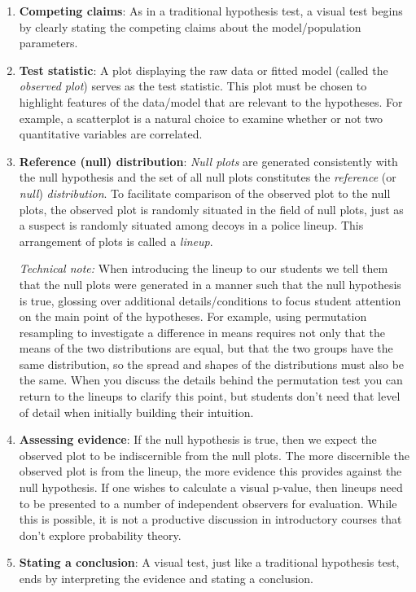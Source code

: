 \documentclass[12pt]{article}
\begin{document}
\begin{enumerate}
\def\labelenumi{\arabic{enumi}.}
\item
  \textbf{Competing claims}: As in a traditional hypothesis test, a
  visual test begins by clearly stating the competing claims about the
  model/population parameters.
\item
  \textbf{Test statistic}: A plot displaying the raw data or fitted
  model (called the \emph{observed plot}) serves as the test statistic.
  This plot must be chosen to highlight features of the data/model that
  are relevant to the hypotheses. For example, a scatterplot is a
  natural choice to examine whether or not two quantitative variables
  are correlated.
\item
  \textbf{Reference (null) distribution}: \emph{Null plots} are
  generated consistently with the null hypothesis and the set of all
  null plots constitutes the \emph{reference} (or \emph{null})
  \emph{distribution}. To facilitate comparison of the observed plot to
  the null plots, the observed plot is randomly situated in the field of
  null plots, just as a suspect is randomly situated among decoys in a
  police lineup. This arrangement of plots is called a \emph{lineup}.

  \emph{Technical note:} When introducing the lineup to our students we
  tell them that the null plots were generated in a manner such that the
  null hypothesis is true, glossing over additional details/conditions
  to focus student attention on the main point of the hypotheses. For
  example, using permutation resampling to investigate a difference in
  means requires not only that the means of the two distributions are
  equal, but that the two groups have the same distribution, so the
  spread and shapes of the distributions must also be the same. When you
  discuss the details behind the permutation test you can return to the
  lineups to clarify this point, but students don't need that level of
  detail when initially building their intuition.
\item
  \textbf{Assessing evidence}: If the null hypothesis is true, then we
  expect the observed plot to be indiscernible from the null plots. The
  more discernible the observed plot is from the lineup, the more
  evidence this provides against the null hypothesis. If one wishes to
  calculate a visual p-value, then lineups need to be presented to a
  number of independent observers for evaluation. While this is
  possible, it is not a productive discussion in introductory courses
  that don't explore probability theory.
\item
  \textbf{Stating a conclusion}: A visual test, just like a traditional
  hypothesis test, ends by interpreting the evidence and stating a
  conclusion.
\end{enumerate}
\end{document}

